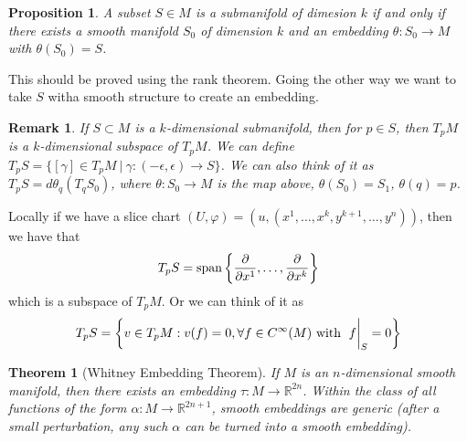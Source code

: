 \documentclass[a4paper]{article}
\newtheorem*{prop}{Proposition}
\newtheorem*{thm}{Theorem}
\newtheorem*{rem}{Remark}
\begin{document}
 \begin{prop}
   A subset $S \in M$ is a submanifold of dimesion $k$ if and only if there exists a smooth manifold $S_0$ of dimension $k$ and an embedding $\theta: S_0 \rightarrow M$ with $\theta(S_0) = S$.
 \end{prop}
 This should be proved using the rank theorem. Going the other way we want to take $S$ witha smooth structure to create an embedding. 

 \begin{rem}
   If $S \subset M$ is a $k$-dimensional submanifold, then for $p \in S$, then $T_pM$ is a $k$-dimensional subspace of $T_pM$. We can define $T_pS = \{ [\gamma] \in T_pM\ |\ \gamma:(-\epsilon, \epsilon) \rightarrow S\}$. We can also think of it as $T_pS = d\theta_q(T_qS_0)$, where $\theta: S_0 \rightarrow M$ is the map above, $\theta(S_0) = S_1$, $\theta(q) = p$.
 \end{rem}

 Locally if we have a slice chart $(U, \varphi) = (u, (x^1, \dots, x^k, y^{k+1}, \dots, y^n))$, then we have that
 \[
 T_pS = \text{span} \left\{ \pdv{}{x^1}, \dots, \pdv{}{x^k} \right\}
 \]
 which is a subspace of $T_pM$. Or we can think of it as
 \[
   T_pS = \left\{ v \in T_pM : v(f) = 0, \forall f \in C^{\infty}(M) \text{ with } \eval{f}_S = 0 \right\}
 \]

 \begin{thm}[Whitney Embedding Theorem]
   If $M$ is an $n$-dimensional smooth manifold, then there exists an embedding $\tau:M \rightarrow \mathds{R}^{2n}$. Within the class of all functions of the form $\alpha: M \rightarrow \mathds{R}^{2n+1}$, smooth embeddings are generic (after a small perturbation, any such $\alpha$ can be turned into a smooth embedding).
 \end{thm}
\end{document}
